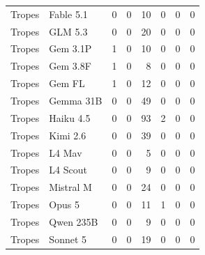 \begin{longtable}{llrrrrrr}
Tropes & Fable 5.1 & 0 & 0 & 10 & 0 & 0 & 0 \\
Tropes & GLM 5.3 & 0 & 0 & 20 & 0 & 0 & 0 \\
Tropes & Gem 3.1P & 1 & 0 & 10 & 0 & 0 & 0 \\
Tropes & Gem 3.8F & 1 & 0 & 8 & 0 & 0 & 0 \\
Tropes & Gem FL & 1 & 0 & 12 & 0 & 0 & 0 \\
Tropes & Gemma 31B & 0 & 0 & 49 & 0 & 0 & 0 \\
Tropes & Haiku 4.5 & 0 & 0 & 93 & 2 & 0 & 0 \\
Tropes & Kimi 2.6 & 0 & 0 & 39 & 0 & 0 & 0 \\
Tropes & L4 Mav & 0 & 0 & 5 & 0 & 0 & 0 \\
Tropes & L4 Scout & 0 & 0 & 9 & 0 & 0 & 0 \\
Tropes & Mistral M & 0 & 0 & 24 & 0 & 0 & 0 \\
Tropes & Opus 5 & 0 & 0 & 11 & 1 & 0 & 0 \\
Tropes & Qwen 235B & 0 & 0 & 9 & 0 & 0 & 0 \\
Tropes & Sonnet 5 & 0 & 0 & 19 & 0 & 0 & 0 \\
\end{longtable}
